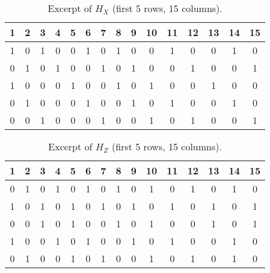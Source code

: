 \begin{table}[h]
\centering
\caption{Excerpt of \(H_X\) (first 5 rows, 15 columns).}
\label{tab:Hx-sample}
\begin{tabular}{ccccccccccccccc}
\toprule
1 & 2 & 3 & 4 & 5 & 6 & 7 & 8 & 9 & 10 & 11 & 12 & 13 & 14 & 15 \\
\midrule
1 & 0 & 1 & 0 & 0 & 1 & 0 & 1 & 0 & 0 & 1 & 0 & 0 & 1 & 0 \\
0 & 1 & 0 & 1 & 0 & 0 & 1 & 0 & 1 & 0 & 0 & 1 & 0 & 0 & 1 \\
1 & 0 & 0 & 0 & 1 & 0 & 0 & 1 & 0 & 1 & 0 & 0 & 1 & 0 & 0 \\
0 & 1 & 0 & 0 & 0 & 1 & 0 & 0 & 1 & 0 & 1 & 0 & 0 & 1 & 0 \\
0 & 0 & 1 & 0 & 0 & 0 & 1 & 0 & 0 & 1 & 0 & 1 & 0 & 0 & 1 \\
\bottomrule
\end{tabular}
\end{table}

\begin{table}[h]
\centering
\caption{Excerpt of \(H_Z\) (first 5 rows, 15 columns).}
\label{tab:Hz-sample}
\begin{tabular}{ccccccccccccccc}
\toprule
1 & 2 & 3 & 4 & 5 & 6 & 7 & 8 & 9 & 10 & 11 & 12 & 13 & 14 & 15 \\
\midrule
0 & 1 & 0 & 1 & 0 & 1 & 0 & 1 & 0 & 1 & 0 & 1 & 0 & 1 & 0 \\
1 & 0 & 1 & 0 & 1 & 0 & 1 & 0 & 1 & 0 & 1 & 0 & 1 & 0 & 1 \\
0 & 0 & 1 & 0 & 1 & 0 & 0 & 1 & 0 & 1 & 0 & 0 & 1 & 0 & 1 \\
1 & 0 & 0 & 1 & 0 & 1 & 0 & 0 & 1 & 0 & 1 & 0 & 0 & 1 & 0 \\
0 & 1 & 0 & 0 & 1 & 0 & 1 & 0 & 0 & 1 & 0 & 1 & 0 & 1 & 0 \\
\bottomrule
\end{tabular}
\end{table}

